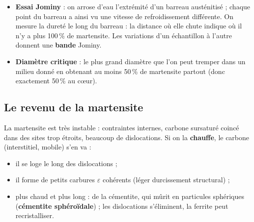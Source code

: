 
\begin{itemize}
  \item \textbf{Essai Jominy} : on arrose d'eau l'extrémité d'un barreau austénitisé ; chaque
        point du barreau a ainsi vu une vitesse de refroidissement différente. On mesure la
        dureté le long du barreau : la distance où elle chute indique où il n'y a plus 100\,\% de
        martensite. Les variations d'un échantillon à l'autre donnent une \textbf{bande} Jominy.
  \item \textbf{Diamètre critique} : le plus grand diamètre que l'on peut tremper dans un milieu
        donné en obtenant au moins 50\,\% de martensite partout (donc exactement 50\,\% au c\oe ur).
\end{itemize}

\subsection*{Le revenu de la martensite}

La martensite est très instable : contraintes internes, carbone sursaturé coincé dans des sites
trop étroits, beaucoup de dislocations. Si on la \textbf{chauffe}, le carbone (interstitiel,
mobile) s'en va :
\begin{itemize}
  \item il se loge le long des dislocations ;
  \item il forme de petits carbures $\varepsilon$ cohérents (léger durcissement structural) ;
  \item plus chaud et plus long : de la cémentite, qui mûrit en particules sphériques
        (\textbf{cémentite sphéroïdale}) ; les dislocations s'éliminent, la ferrite peut
        recristalliser.
\end{itemize}


